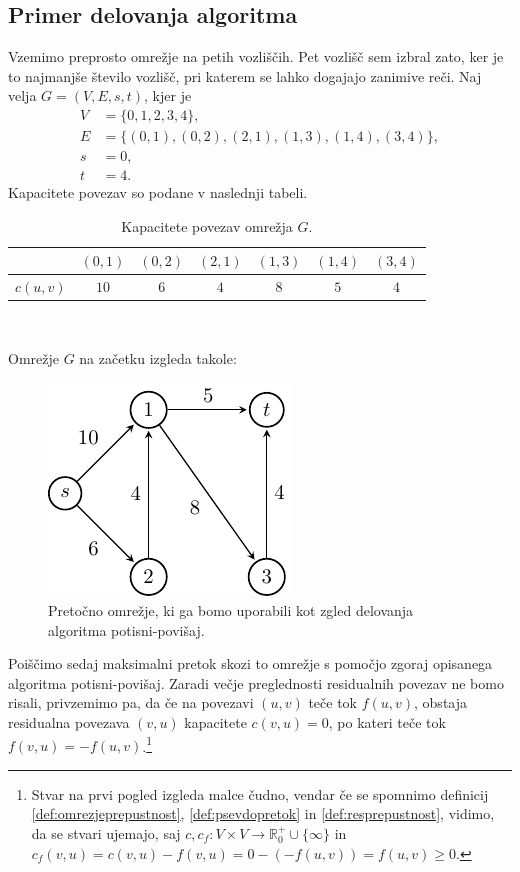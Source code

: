 \documentclass[mat1]{fmfdelo}
\newcommand{\R}{\mathbb R}
\begin{document}
\subsection{Primer delovanja algoritma}

Vzemimo preprosto omrežje na petih vozliščih. Pet vozlišč sem izbral zato, ker je to najmanjše število vozlišč, pri katerem se lahko dogajajo zanimive reči. Naj velja $G = (V, E, s, t)$, kjer je
\begin{align*}
	V &= \{0,1,2,3,4\},\\
	E &= \{(0,1), (0,2), (2,1), (1,3), (1,4), (3,4)\},\\
	s &= 0,\\
	t &= 4.
\end{align*}
Kapacitete povezav so podane v naslednji tabeli.

\begin{table}[h!]
\centering
\caption{Kapacitete povezav omrežja $G$.}
\begin{tabular}{|l|c|c|c|c|c|c|}
\hline
         & $(0,1)$ & $(0,2)$ & $(2,1)$ & $(1,3)$ & $(1,4)$ & $(3,4)$\\ \hline
$c(u,v)$ &   $10$  &   $6$   &   $4$   &   $8$   &   $5$   &   $4$  \\ \hline
\end{tabular}
\end{table}~

Omrežje $G$ na začetku izgleda takole:

\begin{figure}[H]
  \centering
  \includegraphics{images/graf2-1.pdf}
  \caption{Pretočno omrežje, ki ga bomo uporabili kot zgled delovanja algoritma potisni-povišaj.}
\end{figure}

Poiščimo sedaj maksimalni pretok skozi to omrežje s pomočjo zgoraj opisanega algoritma potisni-povišaj.
Zaradi večje preglednosti residualnih povezav ne bomo risali, privzemimo pa, da če na povezavi $(u,v)$ teče tok $f(u,v)$,
obstaja residualna povezava $(v,u)$ kapacitete $c(v,u) = 0$, po kateri teče tok $f(v,u) = -f(u,v)$.\footnote{Stvar na prvi
pogled izgleda malce čudno, vendar če se spomnimo definicij \ref{def:omrezjeprepustnost}, \ref{def:psevdopretok} in \ref{def:resprepustnost}, vidimo,
da se stvari ujemajo, saj $c, c_f \colon V \times V \rightarrow \R^+_0 \cup \{\infty\}$ in $c_f(v,u) = c(v,u) - f(v,u) = 0 - (-f(u,v)) = f(u,v) \geq 0$.}
\end{document}
